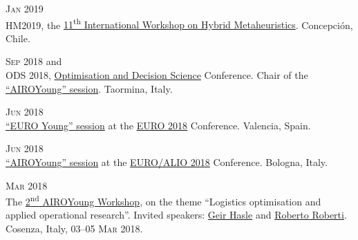 \begin{paracol}{2}
  \textsc{Jan 2019}
\switchcolumn
  \\
  HM2019, the \href{https://web.archive.org/web/20180923151022/http://hm2019.ing.udec.cl/}{11\textsuperscript{th} International Workshop on Hybrid Metaheuristics}.
  Concepción, Chile.
\end{paracol}

\begin{paracol}{2}
  \textsc{Sep 2018}
\switchcolumn
   and \\
  ODS 2018, \href{http://web.archive.org/web/20180923151224/http://www.airoconference.it/ods2018/committee}{Optimisation and Decision Science} Conference. Chair of the \href{https://santini.in/files/cv/ods18-prog.pdf}{``AIROYoung'' session}.
  Taormina, Italy.
\end{paracol}

\begin{paracol}{2}
  \textsc{Jun 2018}
\switchcolumn
  \\
  \href{https://santini.in/files/cv/euro18-prog.pdf}{``EURO Young'' session} at the \href{http://web.archive.org/web/20180923151458/http://euro2018valencia.com/}{EURO 2018} Conference.
  Valencia, Spain.
\end{paracol}

\begin{paracol}{2}
  \textsc{Jun 2018}
\switchcolumn
  \\
  \href{https://santini.in/files/cv/euroalio18-prog.pdf}{``AIROYoung'' session} at the \href{http://web.archive.org/web/20180923151741/https://events.unibo.it/euroalio2018}{EURO/ALIO 2018} Conference.
  Bologna, Italy.
\end{paracol}

\begin{paracol}{2}
  \textsc{Mar 2018}
\switchcolumn
  \\
  The \href{https://workshop.airoyoung.org/2018}{2\textsuperscript{nd} AIROYoung Workshop}, on the theme ``Logistics optimisation and applied operational research''.
  Invited speakers: \href{https://scholar.google.it/citations?user=GXRnRZgAAAAJ&hl}{Geir Hasle} and \href{https://scholar.google.it/citations?user=pNQZmwIAAAAJ}{Roberto Roberti}.
  Cosenza, Italy, \textsc{03--05 Mar 2018}.
\end{paracol}

